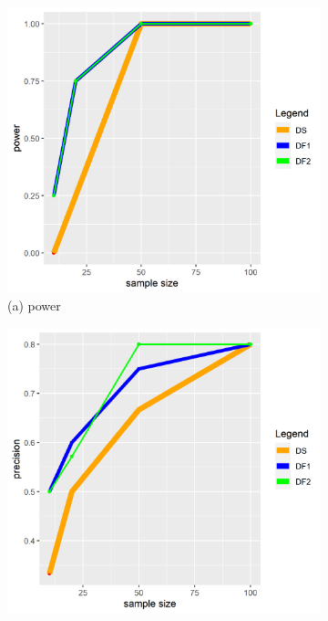 \captionsetup[subfigure]{labelformat=empty}
\begin{figure}[ht!]
\centering
\begin{subfigure}[b]{.32\columnwidth} 
    \includegraphics[width=\columnwidth]{../../plot/power_1.png}
    \caption{(a) power}
\end{subfigure}
\hfill
\centering
\begin{subfigure}[b]{.32\columnwidth} 
    \includegraphics[width=\columnwidth]{../../plot/precision_1.png}

\end{subfigure}
\end{figure}
